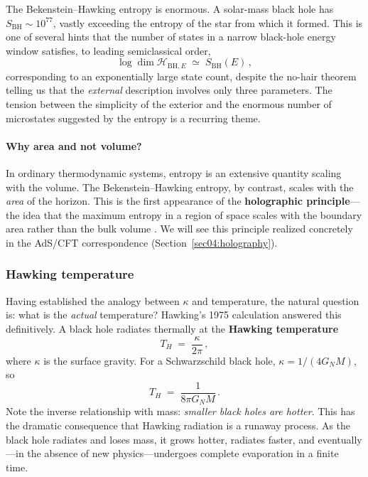 \documentclass[11pt,letterpaper]{article}
\theoremstyle{plain}
\theoremstyle{definition}
\theoremstyle{remark}
\newcommand{\Hcal}{\mathcal{H}}
\begin{document}
The Bekenstein--Hawking entropy is enormous.  A solar-mass black hole has
$S_{\mathrm{BH}} \sim 10^{77}$, vastly exceeding the entropy of the
star from which it formed.  This is one of several hints that the
number of states in a narrow black-hole energy window satisfies, to
leading semiclassical order,
\begin{equation}\label{eq03:hilbert_dim}
  \log \dim \Hcal_{\mathrm{BH},E} \;\simeq\; S_{\mathrm{BH}}(E)\,,
\end{equation}
corresponding to an exponentially large state count, despite the no-hair theorem telling us
that the \emph{external} description involves only three parameters.
The tension between the simplicity of the exterior and the enormous
number of microstates suggested by the entropy is a recurring theme.

\paragraph{Why area and not volume?}
In ordinary thermodynamic systems, entropy is an extensive quantity
scaling with the volume.  The Bekenstein--Hawking entropy, by contrast, scales
with the \emph{area} of the horizon.  This is the first appearance
of the \textbf{holographic principle}---the idea that the maximum
entropy in a region of space scales with the boundary area rather than
the bulk volume \cite{thooft1993,susskind1995}.  We will see this
principle realized concretely in the AdS/CFT correspondence
(Section~\ref{sec04:holography}).

\subsubsection*{Hawking temperature}

Having established the analogy between $\kappa$ and temperature,
the natural question is: what is the \emph{actual} temperature?
Hawking's 1975 calculation \cite{hawking1975} answered this definitively.
A black hole radiates thermally at the \textbf{Hawking temperature}
\begin{equation}\label{eq03:hawking_temp}
  T_{H} \;=\; \frac{\kappa}{2\pi}\,,
\end{equation}
where $\kappa$ is the surface gravity.  For a Schwarzschild black hole,
$\kappa = 1/(4G_{N}M)$, so
\begin{equation}\label{eq03:hawking_temp_schwarz}
  T_{H} \;=\; \frac{1}{8\pi G_{N} M}\,.
\end{equation}
Note the inverse relationship with mass: \emph{smaller black holes are
hotter}.  This has the dramatic consequence that Hawking radiation is a
runaway process.  As the black hole radiates and loses mass, it grows
hotter, radiates faster, and eventually---in the absence of new
physics---undergoes complete evaporation in a finite time.
\end{document}
